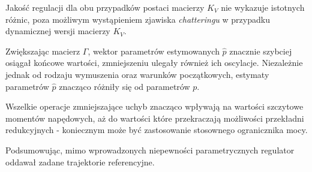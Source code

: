 \documentclass[10pt, a4paper, polish]{article}
\begin{document}
Jakość regulacji dla obu przypadków postaci macierzy $K_V$ nie wykazuje istotnych różnic, poza możliwym wystąpieniem zjawiska \textit{chatteringu} w przypadku dynamicznej wersji macierzy $K_V$.

Zwiększając macierz $\Gamma$, wektor parametrów estymowanych $\hat{p}$ znacznie szybciej osiągał końcowe wartości, zmniejszeniu ulegały również ich oscylacje. Niezależnie jednak od rodzaju wymuszenia oraz warunków początkowych, estymaty parametrów $\hat{p}$ znacząco różniły się od parametrów $p$.

Wszelkie operacje zmniejszające uchyb znacząco wpływają na wartości szczytowe momentów napędowych, aż do wartości które przekraczają możliwości przekładni redukcyjnych - koniecznym może być zastosowanie stosownego ogranicznika mocy. 

Podsumowując, mimo wprowadzonych niepewności parametrycznych regulator oddawał zadane trajektorie referencyjne.
\end{document}
